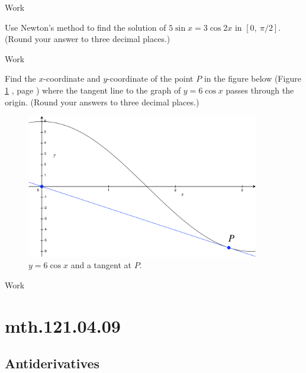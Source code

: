 \documentclass[12pt,addpoints, answers, fleqn]{exam}
\begin{document}
\begin{teacher}
\begin{questions}
\begin{solution}
Work
\end{solution}

\question 	%

Use Newton's method to find the solution of $5 \sin x = 3 \cos 2x$ in $\left[0, \ \pi/2 \right]$. (Round your answer to three decimal places.)

\begin{solution}
Work
\end{solution}

\question 	%

Find the $x$-coordinate and $y$-coordinate of the point $P$ in the figure below (Figure \ref{fig:1739527} , page \pageref{fig:1739527}) where the tangent line to the graph of $y = 6 \cos x$ passes through the origin. (Round your answers to three decimal places.)
 \begin{figure}[htbp] %
   \centering
   \includegraphics[width=4in]{./graphics/1739527.pdf} 
   \caption{ $y = 6 \cos x$ and a tangent at $P$.}
   \label{fig:1739527}
\end{figure}
 
 \begin{solution}
Work
\end{solution}

\end{questions}
\end{teacher}
\vfill
\pagebreak


\section{mth.121.04.09}
\subsection{Antiderivatives}
\end{document}
